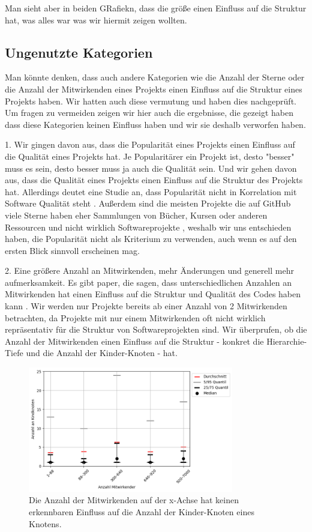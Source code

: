 Man sieht aber in beiden GRafiekn, dass die größe einen Einfluss auf die Struktur hat, was alles war was wir hiermit zeigen wollten.

\subsection*{Ungenutzte Kategorien}
Man könnte denken, dass auch andere Kategorien wie die Anzahl der Sterne oder die Anzahl der Mitwirkenden eines Projekts einen Einfluss auf die Struktur eines Projekts haben. Wir hatten auch diese vermutung und haben dies nachgeprüft. Um fragen zu vermeiden zeigen wir hier auch die ergebnisse, die gezeigt haben dass diese Kategorien keinen Einfluss haben und wir sie deshalb verworfen haben.

1. Wir gingen davon aus, dass die Popularität eines Projekts einen Einfluss auf die Qualität eines Projekts hat. Je Popularitärer ein Projekt ist, desto "besser" muss es sein, desto besser muss ja auch die Qualität sein. Und wir gehen davon aus, dass die Qualität eines Projekts einen Einfluss auf die Struktur des Projekts hat. Allerdings deutet eine Studie an, dass Popularität nicht in Korrelation mit Software Qualität steht \cite{popAndQuality}. Außerdem sind die meisten Projekte die auf GitHub viele Sterne haben eher Sammlungen von Bücher, Kursen oder anderen Ressourcen und nicht wirklich Softwareprojekte \cite{evanli_github-ranking_2025}, weshalb wir uns entschieden haben, die Popularität nicht als Kriterium zu verwenden, auch wenn es auf den ersten Blick sinnvoll erscheinen mag.

2. Eine größere Anzahl an Mitwirkenden, mehr Änderungen und generell mehr aufmerksamkeit. 
Es gibt paper, die sagen, dass unterschiedlichen Anzahlen an Mitwirkenden hat einen Einfluss auf die Struktur und Qualität des Codes haben kann \cite{numDevs}. Wir werden nur Projekte bereits ab einer Anzahl von 2 Mitwirkenden betrachten, da Projekte mit nur einem Mitwirkenden oft nicht wirklich repräsentativ für die Struktur von Softwareprojekten sind. 
Wir überprufen, ob die Anzahl der Mitwirkenden einen Einfluss auf die Struktur - konkret die Hierarchie-Tiefe und die Anzahl der Kinder-Knoten - hat.

\begin{figure}
    \centering
    \includegraphics[width=0.8\textwidth]{images/datenanalyse/mitwirkendeVsKindknoten.png}
    \caption{Die Anzahl der Mitwirkenden auf der x-Achse hat keinen erkennbaren Einfluss auf die Anzahl der Kinder-Knoten eines Knotens.}
    \label{fig:mitwirkendeVsKindknoten}
\end{figure}


